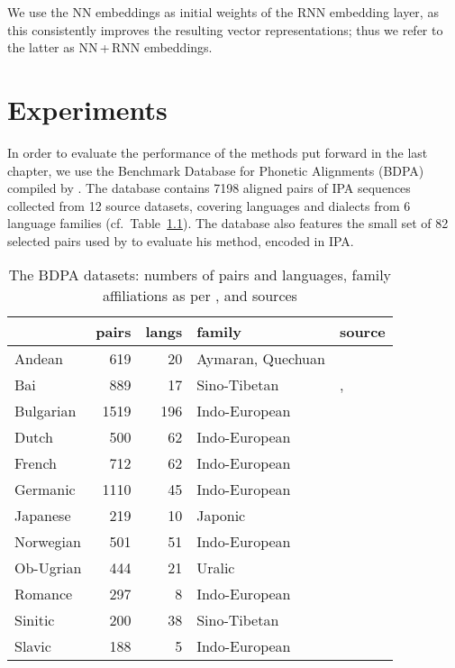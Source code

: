 \documentclass[a4paper]{report}
\begin{document}
We use the NN embeddings as initial weights of the RNN embedding layer, as this consistently improves the resulting vector representations;
thus we refer to the latter as NN\,+\,RNN embeddings.


\chapter{Experiments}

In order to evaluate the performance of the methods put forward in the last chapter,
we use the Benchmark Database for Phonetic Alignments (BDPA) compiled by \citet{2014_List_Prokić}.
The database contains 7198 aligned pairs of IPA sequences collected from 12 source datasets,
covering languages and dialects from 6 language families (cf.~Table~\ref{tab:bdpa}).
The database also features the small set of 82 selected pairs used by \citet{1996_Covington} to evaluate his method, encoded in IPA.

\begin{table}[h]
	\centering\small
	\begin{tabular}{l r r l l}
		\toprule
		& pairs & langs & family & source \\
		\midrule
		Andean		& 619	& 20	& Aymaran, Quechuan	& \citet{2006_Heggarty} \\
		Bai			& 889	& 17	& Sino-Tibetan		& \citet{2006_Wang}, \citet{2007_Allen} \\
		Bulgarian	& 1519	& 196	& Indo-European		& \citet{2009_Prokić_al} \\
		Dutch		& 500	& 62	& Indo-European		& \citet{2005_Schutter_al} \\
		French		& 712	& 62	& Indo-European		& \citet{1925_Gauchat_al} \\
		Germanic	& 1110	& 45	& Indo-European		& \citet{2009_Renfrew_Heggarty} \\
		Japanese	& 219	& 10	& Japonic			& \citet{1973_Shirō} \\
		Norwegian	& 501	& 51	& Indo-European		& \citet{2011_Almberg_Skarbø} \\
		Ob-Ugrian	& 444	& 21	& Uralic			& \citet{2011_Zhivlov} \\
		Romance		& 297	& 8		& Indo-European		& \citet{2009_Renfrew_Heggarty} \\
		Sinitic		& 200	& 38	& Sino-Tibetan		& \citet{2004_Hóu} \\
		Slavic		& 188	& 5		& Indo-European		& \citet{2008_Derksen} \\
		\bottomrule
	\end{tabular}
	\caption{The BDPA datasets: numbers of pairs and languages, family affiliations as per \citet{2018_Hammarström_al}, and sources}
	\label{tab:bdpa}
\end{table}
\end{document}
